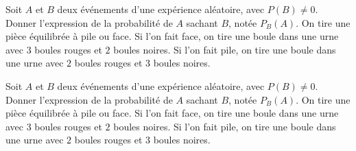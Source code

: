\documentclass{exam}
\begin{document}
\begin{questions}
\question Soit $A$ et $B$ deux événements d'une expérience aléatoire, avec $P(B) \neq 0$. Donner l'expression de la probabilité de $A$ sachant $B$, notée $P_B(A)$.
\vspace*{0.5cm}
\question On tire une pièce équilibrée à pile ou face. Si l'on fait face, on tire une boule dans une urne avec $3$ boules rouges et $2$ boules noires. Si l'on fait pile, on tire une boule dans une urne avec $2$ boules rouges et $3$ boules noires.
\end{questions}
\vspace*{1cm}
\begin{questions}
\question Soit $A$ et $B$ deux événements d'une expérience aléatoire, avec $P(B) \neq 0$. Donner l'expression de la probabilité de $A$ sachant $B$, notée $P_B(A)$.
\vspace*{0.5cm}
\question On tire une pièce équilibrée à pile ou face. Si l'on fait face, on tire une boule dans une urne avec $3$ boules rouges et $2$ boules noires. Si l'on fait pile, on tire une boule dans une urne avec $2$ boules rouges et $3$ boules noires.
\end{questions}
\end{document}
